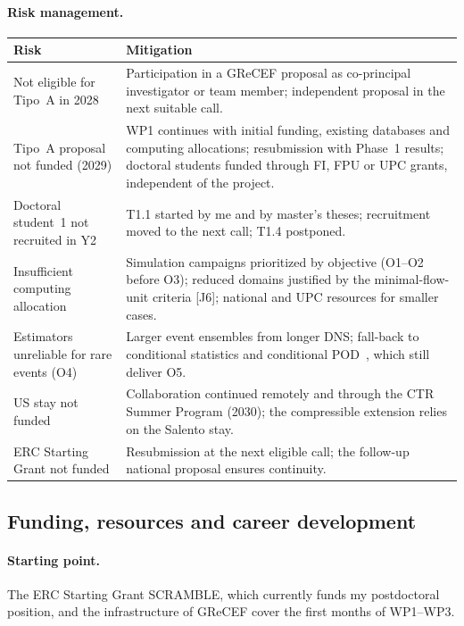 \documentclass[11pt]{article}
\begin{document}
\paragraph{Risk management.}
\begin{center}\small
\begin{tabularx}{\textwidth}{@{}>{\raggedright\arraybackslash}p{4.4cm}X@{}}
\toprule
\textbf{Risk} & \textbf{Mitigation} \\
\midrule
Not eligible for Tipo~A in 2028 & Participation in a GReCEF proposal as co-principal investigator or team member; independent proposal in the next suitable call. \\
Tipo~A proposal not funded (2029) & WP1 continues with initial funding, existing databases and computing allocations; resubmission with Phase~1 results; doctoral students funded through FI, FPU or UPC grants, independent of the project. \\
Doctoral student~1 not recruited in Y2 & T1.1 started by me and by master's theses; recruitment moved to the next call; T1.4 postponed. \\
Insufficient computing allocation & Simulation campaigns prioritized by objective (O1--O2 before O3); reduced domains justified by the minimal-flow-unit criteria [J6]; national and UPC resources for smaller cases. \\
Estimators unreliable for rare events (O4) & Larger event ensembles from longer DNS; fall-back to conditional statistics and conditional POD~\cite{Martin2025}, which still deliver O5. \\
US stay not funded & Collaboration continued remotely and through the CTR Summer Program (2030); the compressible extension relies on the Salento stay. \\
ERC Starting Grant not funded & Resubmission at the next eligible call; the follow-up national proposal ensures continuity. \\
\bottomrule
\end{tabularx}
\end{center}

\subsection{Funding, resources and career development}\label{sec:resources}
\paragraph{Starting point.} The ERC Starting Grant SCRAMBLE, which currently funds my
postdoctoral position, and the infrastructure of GReCEF cover the first months of WP1--WP3.
\end{document}
